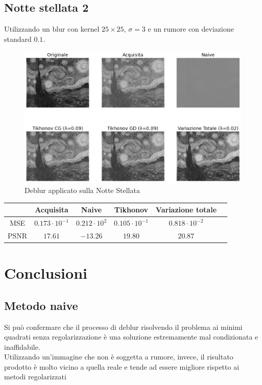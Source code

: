 \documentclass[11pt]{article}
\begin{document}
\subsection{Notte stellata 2}
Utilizzando un blur con kernel $25 \times 25$, $\sigma=3$ e un rumore con deviazione standard $0.1$.
\begin{figure}[H]
    \centering
    \includegraphics[width=12cm]{reale/1/2/deblur.png}
    \caption{Deblur applicato sulla Notte Stellata}
    \label{fig:deblur_reale1_2}
\end{figure}
\begin{center}
    \begin{tabular}{ |c|c|c|c|c|c| }
    \hline
    & Acquisita & Naive & Tikhonov & Variazione totale \\ 
    \hline
    MSE & $0.173 \cdot 10^{-1}$ & $0.212 \cdot 10^{2}$ & $0.105 \cdot 10^{-1}$ & $0.818 \cdot 10^{-2}$ \\ 
    PSNR & $17.61$ & $-13.26$ & $19.80$ & $20.87$ \\ 
    \hline
    \end{tabular}
\end{center}

\section{Conclusioni}
\subsection{Metodo naive}
Si può confermare che il processo di deblur risolvendo il problema ai minimi quadrati senza regolarizzazione è una soluzione estremamente mal condizionata e inaffidabile.\\
Utilizzando un'immagine che non è soggetta a rumore, invece, il risultato prodotto è molto vicino a quella reale e tende ad essere migliore rispetto ai metodi regolarizzati
\end{document}

